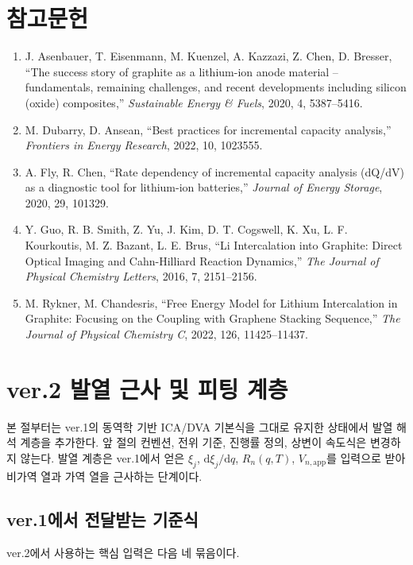\documentclass[11pt,a4paper]{article}
\newcommand{\dd}{\mathrm{d}}
\newcommand{\app}{\mathrm{app}}
\begin{document}
\section{참고문헌}
\begin{enumerate}
\item J. Asenbauer, T. Eisenmann, M. Kuenzel, A. Kazzazi, Z. Chen, D. Bresser, ``The success story of graphite as a lithium-ion anode material -- fundamentals, remaining challenges, and recent developments including silicon (oxide) composites,'' \emph{Sustainable Energy \& Fuels}, 2020, 4, 5387--5416.
\item M. Dubarry, D. Ansean, ``Best practices for incremental capacity analysis,'' \emph{Frontiers in Energy Research}, 2022, 10, 1023555.
\item A. Fly, R. Chen, ``Rate dependency of incremental capacity analysis (dQ/dV) as a diagnostic tool for lithium-ion batteries,'' \emph{Journal of Energy Storage}, 2020, 29, 101329.
\item Y. Guo, R. B. Smith, Z. Yu, J. Kim, D. T. Cogswell, K. Xu, L. F. Kourkoutis, M. Z. Bazant, L. E. Brus, ``Li Intercalation into Graphite: Direct Optical Imaging and Cahn-Hilliard Reaction Dynamics,'' \emph{The Journal of Physical Chemistry Letters}, 2016, 7, 2151--2156.
\item M. Rykner, M. Chandesris, ``Free Energy Model for Lithium Intercalation in Graphite: Focusing on the Coupling with Graphene Stacking Sequence,'' \emph{The Journal of Physical Chemistry C}, 2022, 126, 11425--11437.
\end{enumerate}

\clearpage
{}
\section{ver.2 발열 근사 및 피팅 계층}
본 절부터는 ver.1의 동역학 기반 ICA/DVA 기본식을 그대로 유지한 상태에서 발열 해석 계층을 추가한다. 앞 절의 컨벤션, 전위 기준, 진행률 정의, 상변이 속도식은 변경하지 않는다. 발열 계층은 ver.1에서 얻은 \(\xi_j\), \(\dd\xi_j/\dd q\), \(R_n(q,T)\), \(V_{n,\app}\)를 입력으로 받아 비가역 열과 가역 열을 근사하는 단계이다.

\subsection{ver.1에서 전달받는 기준식}
ver.2에서 사용하는 핵심 입력은 다음 네 묶음이다.
\end{document}
